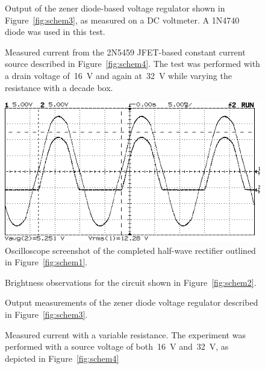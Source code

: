 \begin{figure}[H]
	\centering
	
	\parbox{4.25in}{
	\caption{Output of the zener diode-based voltage regulator shown in
		Figure~\ref{fig:schem3}, as measured on a DC voltmeter.  A 1N4740 diode
		was used in this test.}
	\label{fig:ckt3plot}}
\end{figure}

\begin{figure}[H]
	\centering
	
	\parbox{4.25in}{
	\caption{Measured current from the 2N5459 JFET-based constant current
		source described in Figure~\ref{fig:schem4}.  The test was performed
		with a drain voltage of~\SI{16}{\volt} and again at~\SI{32}{\volt}
		while varying the resistance with a decade box.}
	\label{fig:ckt4plot}}
\end{figure}

\begin{figure}[H]
	\centering
	\includegraphics[width=.6\textwidth]{img/ss1.png}
	\caption{Oscilloscope screenshot of the completed half-wave rectifier
		outlined in Figure~\ref{fig:schem1}.}
	\label{fig:ck1data}
\end{figure}

\begin{figure}[H]
	\centering
	
	\caption{Brightness observations for the circuit shown in
		Figure~\ref{fig:schem2}.}
	\label{tab:ckt2data}
\end{figure}

\begin{figure}[H]
	\centering
	
	\caption{Output measurements of the zener diode voltage
		regulator described in Figure~\ref{fig:schem3}.}
	\label{tab:ckt3data}
\end{figure}

\begin{figure}[H]
	\centering
	
	\caption{Measured current with a variable resistance.  The experiment was
		performed with a source voltage of both~\SI{16}{\volt}
		and~\SI{32}{\volt}, as depicted in Figure~\ref{fig:schem4}}
	\label{tab:ckt4data}
\end{figure}
